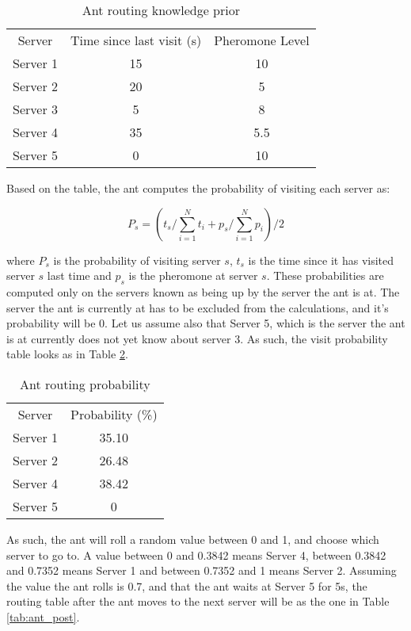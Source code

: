 \begin{table}[]
\centering
\begin{tabular}{c|c|c}
Server & Time since last visit (s) & Pheromone Level \\
Server 1 & 15 & 10 \\ 
Server 2 & 20 & 5 \\
Server 3 & 5 & 8 \\
Server 4 & 35 & 5.5 \\
Server 5 & 0 & 10 \\
\end{tabular}
\caption{Ant routing knowledge prior}
\label{tab:ant_prio}
\end{table}

Based on the table, the ant computes the probability of visiting each server as:

\begin{equation}
P_s = (t_s / \sum_{i=1}^{N} t_i + p_{s} / \sum_{i=1}^{N} p_i) / 2
\end{equation}

where $P_s$ is the probability of visiting server $s$, $t_s$ is the time since it has visited server $s$ last time and $p_{s}$ is the pheromone at server $s$. These probabilities are computed only on the servers known as being up by the server the ant is at. The server the ant is currently at has to be excluded from the calculations, and it's probability will be 0. Let us assume also that Server 5, which is the server the ant is at currently does not yet know about server 3. As such, the visit probability table looks as in Table \ref{tab:ant_prob}.

\begin{table}[]
\centering
\begin{tabular}{c|c}
Server & Probability (\%) \\
Server 1 & 35.10 \\
Server 2 & 26.48 \\
Server 4 & 38.42 \\
Server 5 & 0 \\
\end{tabular}
\caption{Ant routing probability}
\label{tab:ant_prob}
\end{table}

As such, the ant will roll a random value between 0 and 1, and choose which server to go to. A value between 0 and 0.3842 means Server 4, between 0.3842 and 0.7352 means Server 1 and between 0.7352 and 1 means Server 2. Assuming the value the ant rolls is 0.7, and that the ant waits at Server 5 for 5s, the routing table after the ant moves to the next server will be as the one in Table \ref{tab:ant_post}.


